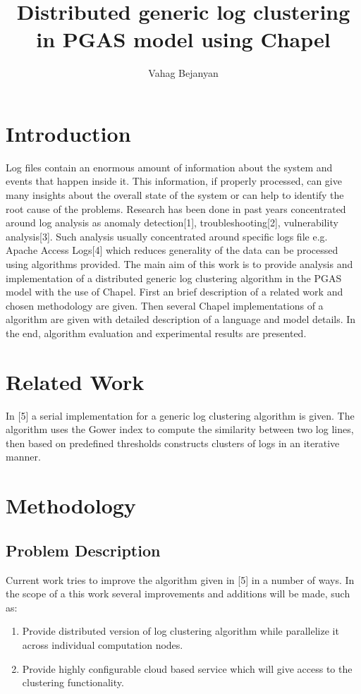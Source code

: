 \documentclass{article}
\title{Distributed generic log clustering in PGAS model using Chapel}
\author{Vahag Bejanyan}
\begin{document}
\maketitle
{}
\newpage
{}

\section{Introduction}
Log files contain an enormous amount of information about the system and events that happen inside it. This information, if properly processed, can give many insights about the overall state of the system or can help to identify the root cause of the problems. Research has been done in past years concentrated around log analysis as anomaly detection[1], troubleshooting[2], vulnerability analysis[3]. Such analysis usually concentrated around specific logs file e.g. Apache Access Logs[4] which reduces generality of the data can be processed using algorithms provided. The main aim of this work is to provide analysis and implementation of a distributed generic log clustering algorithm in the PGAS model with the use of Chapel. First an brief description of a related work and chosen methodology are given. Then several Chapel implementations of a algorithm are given with detailed description of a language and model details. In the end, algorithm evaluation and experimental results are presented.

\section{Related Work}
In [5] a serial implementation for a generic log clustering algorithm is given. The algorithm uses the Gower index to compute the similarity between two log lines, then based on predefined thresholds constructs clusters of logs in an iterative manner.

\section{Methodology}
\subsection{Problem Description}
Current work tries to improve the algorithm given in [5] in a number of ways. In the scope of a this work several improvements and additions will be made, such as:
\begin{enumerate}
	\item{Provide distributed version of log clustering algorithm while parallelize it across individual computation nodes.}
	\item{Provide highly configurable cloud based service which will give access to the clustering functionality.}
\end{enumerate}
\end{document}
